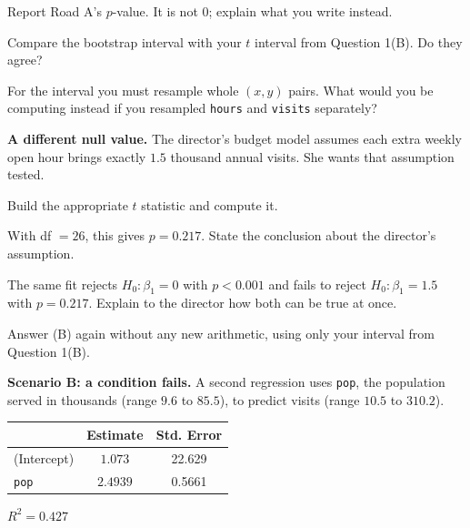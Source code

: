 \documentclass[11pt]{article}
\newcommand{\answerspace}[1]{\vspace{#1}}
\begin{document}
\begin{questions}
\begin{parts}
\item Report Road A's $p$-value. It is not $0$; explain what you write instead.
\answerspace{3em}

\item Compare the bootstrap interval with your $t$ interval from Question 1(B). Do they agree?
\answerspace{3.5em}

\item For the interval you must resample whole $(x,y)$ pairs. What would you be computing instead
if you resampled \texttt{hours} and \texttt{visits} separately?
\answerspace{3.5em}
\end{parts}

\item \textbf{A different null value.} The director's budget model assumes each extra weekly open
hour brings exactly $1.5$ thousand annual visits. She wants that assumption tested.

\begin{parts}
\item Build the appropriate $t$ statistic and compute it.
\answerspace{4em}

\item With df $= 26$, this gives $p = 0.217$. State the conclusion about the director's assumption.
\answerspace{3.5em}

\item The same fit rejects $H_0: \beta_1 = 0$ with $p < 0.001$ and fails to reject
$H_0: \beta_1 = 1.5$ with $p = 0.217$. Explain to the director how both can be true at once.
\answerspace{4.5em}

\item Answer (B) again without any new arithmetic, using only your interval from Question 1(B).
\answerspace{3em}
\end{parts}

\item \textbf{Scenario B: a condition fails.} A second regression uses \texttt{pop}, the population
served in thousands (range $9.6$ to $85.5$), to predict visits (range $10.5$ to $310.2$).

\begin{center}
\renewcommand{\arraystretch}{1.2}
\begin{tabular}{lcc}
\toprule
 & \textbf{Estimate} & \textbf{Std. Error} \\
\midrule
(Intercept) & $1.073$ & 22.629 \\
\texttt{pop} & $2.4939$ & 0.5661 \\
\bottomrule
\end{tabular}
\qquad $R^2 = 0.427$
\end{center}


\end{questions}
\end{document}
